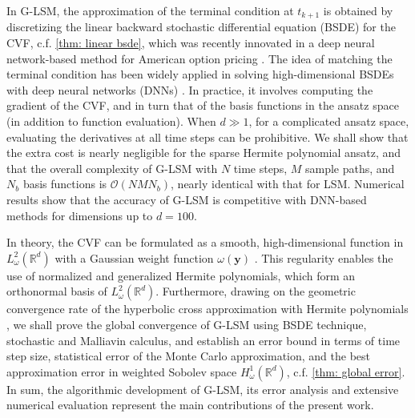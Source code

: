 \documentclass[10pt,a4paper]{amsart}
\numberwithin{equation}{section}
\numberwithin{algorithm}{section}
\theoremstyle{plain}
\theoremstyle{remark}
\newcommand{\R}{\mathbb{R}}
\begin{document}
In G-LSM, the approximation of the terminal condition at $t_{k+1}$ is obtained by discretizing the linear backward stochastic differential equation (BSDE) for the CVF, c.f. \cref{thm: linear bsde}, which was recently innovated in a deep neural network-based method for American option pricing \cite{chen2021deep}. The idea of matching the terminal condition has been widely applied in solving high-dimensional BSDEs with deep neural networks (DNNs) \cite{E2017deepbsde, hure2020deep}. In practice, it involves computing the gradient of the CVF, and in turn that of the basis functions in the ansatz space (in addition to function evaluation). When $d\gg1$, for a complicated ansatz space, evaluating the derivatives at all time steps can be prohibitive. We shall show that the extra cost is nearly negligible for the sparse Hermite polynomial ansatz, and that the overall complexity of G-LSM with $N$ time steps, $M$ sample paths, and $N_b$ basis functions is $\mathcal{O}(NMN_b)$, nearly identical with that for LSM. Numerical results show that the accuracy of G-LSM is competitive with DNN-based methods for dimensions up to $d = 100$.

In theory, the CVF can be formulated as a smooth, high-dimensional function in ${L}^2_{\omega}(\R^d)$ with a Gaussian weight function $\omega(\mathbf{y})$ \cite{yang2023optionpricing}.
This regularity enables the use of normalized and generalized Hermite polynomials, which form an orthonormal basis of $L^2_{\omega}(\R^d)$. Furthermore, drawing on the geometric convergence rate of the hyperbolic cross approximation with Hermite polynomials \cite{luo2018error}, we shall prove the global convergence of G-LSM using BSDE technique, stochastic and Malliavin calculus, and establish an error bound in terms of time step size, statistical error of the Monte Carlo approximation, and the best approximation error in weighted Sobolev space $H^1_{\omega}(\R^d)$, c.f. \cref{thm: global error}. In sum, the algorithmic development of G-LSM, its error analysis and extensive numerical evaluation represent the main contributions of the present work.
\end{document}

